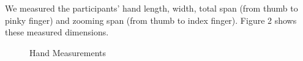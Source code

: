 \documentclass{sigchi}
\begin{document}
We measured the participants' hand length, width, total span (from thumb to pinky finger) and zooming span (from thumb to index finger). Figure 2 shows these measured dimensions.

\begin{figure}[h!]
\caption{Hand Measurements}\label{fig:hand}
\end{figure} 
\end{document}
